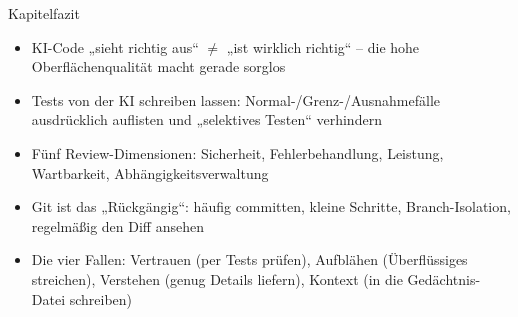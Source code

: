 \begin{tcbsummary}{Kapitelfazit}
\begin{itemize}
  \item KI-Code „sieht richtig aus“ $\neq$ „ist wirklich richtig“ – die hohe Oberflächenqualität macht gerade sorglos
  \item Tests von der KI schreiben lassen: Normal-/Grenz-/Ausnahmefälle ausdrücklich auflisten und „selektives Testen“ verhindern
  \item Fünf Review-Dimensionen: Sicherheit, Fehlerbehandlung, Leistung, Wartbarkeit, Abhängigkeitsverwaltung
  \item Git ist das „Rückgängig“: häufig committen, kleine Schritte, Branch-Isolation, regelmäßig den Diff ansehen
  \item Die vier Fallen: Vertrauen (per Tests prüfen), Aufblähen (Überflüssiges streichen), Verstehen (genug Details liefern), Kontext (in die Gedächtnis-Datei schreiben)
\end{itemize}

\end{tcbsummary}
